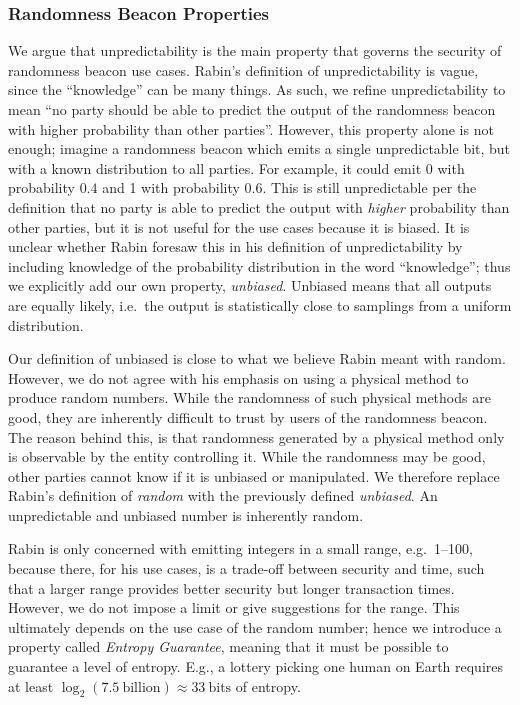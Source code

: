 \subsubsection{Randomness Beacon Properties}
We argue that unpredictability is the main property that governs the security of randomness beacon use cases.
Rabin's definition of unpredictability is vague, since the \enquote{knowledge} can be many things.
As such, we refine unpredictability to mean \enquote{no party should be able to predict the output of the randomness beacon with higher probability than other parties}.
However, this property alone is not enough; imagine a randomness beacon which emits a single unpredictable bit, but with a known distribution to all parties.
For example, it could emit 0 with probability $0.4$ and 1 with probability $0.6$.
This is still unpredictable per the definition that no party is able to predict the output with \emph{higher} probability than other parties, but it is not useful for the use cases because it is biased.
It is unclear whether Rabin foresaw this in his definition of unpredictability by including knowledge of the probability distribution in the word \enquote{knowledge}; thus we explicitly add our own property, \emph{unbiased}.
Unbiased means that all outputs are equally likely, i.e.\ the output is statistically close to samplings from a uniform distribution.

Our definition of unbiased is close to what we believe Rabin meant with random.
However, we do not agree with his emphasis on using a physical method to produce random numbers.
While the randomness of such physical methods are good, they are inherently difficult to trust by users of the randomness beacon.
The reason behind this, is that randomness generated by a physical method only is observable by the entity controlling it.
While the randomness may be good, other parties cannot know if it is unbiased or manipulated.
We therefore replace Rabin's definition of \emph{random} with the previously defined \emph{unbiased}.
An unpredictable and unbiased number is inherently random.

Rabin is only concerned with emitting integers in a small range, e.g.\ 1--100, because there, for his use cases, is a trade-off between security and time, such that a larger range provides better security but longer transaction times.
However, we do not impose a limit or give suggestions for the range.
This ultimately depends on the use case of the random number;
hence we introduce a property called \emph{Entropy Guarantee}, meaning that it must be possible to guarantee a level of entropy.
E.g., a lottery picking one human on Earth requires at least $\log_2(7.5~\text{billion}) \approx 33~\text{bits}$ of entropy.

